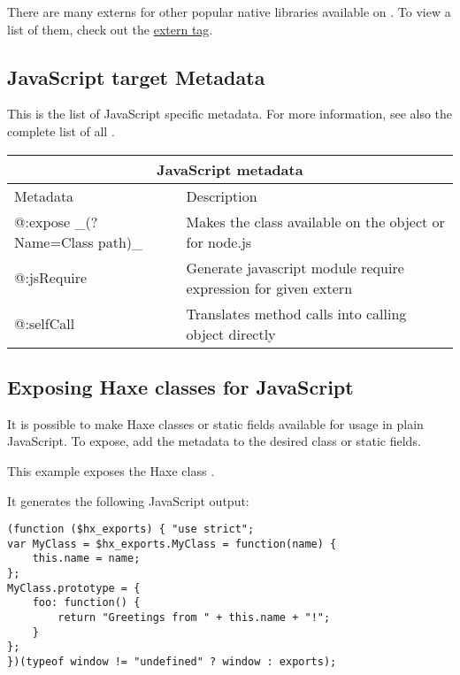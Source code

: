 There are many externs for other popular native libraries available on . To view a list of them, check out the \href{http://lib.haxe.org/t/extern/}{extern tag}.

\subsection{JavaScript target Metadata}
\label{target-javascript-metadata}

This is the list of JavaScript specific metadata. For more information, see also the complete list of all .

\begin{center}
\begin{tabular}{| l | l |}
	\hline
	\multicolumn{2}{|c|}{JavaScript metadata} \\ \hline
	Metadata &  Description \\ \hline
	@:expose \_(?Name=Class path)\_  &  Makes the class available on the \expr{window} object or \expr{exports} for node.js  \\
	@:jsRequire  &  Generate javascript module require expression for given extern \\
	@:selfCall  &  Translates method calls into calling object directly \\
\end{tabular}
\end{center}

\subsection{Exposing Haxe classes for JavaScript}
\label{target-javascript-expose}

It is possible to make Haxe classes or static fields available for usage in plain JavaScript. 
To expose, add the  metadata to the desired class or static fields.

This example exposes the Haxe class .


It generates the following JavaScript output:

\begin{lstlisting}
(function ($hx_exports) { "use strict";
var MyClass = $hx_exports.MyClass = function(name) {
	this.name = name;
};
MyClass.prototype = {
	foo: function() {
		return "Greetings from " + this.name + "!";
	}
};
})(typeof window != "undefined" ? window : exports);
\end{lstlisting}


